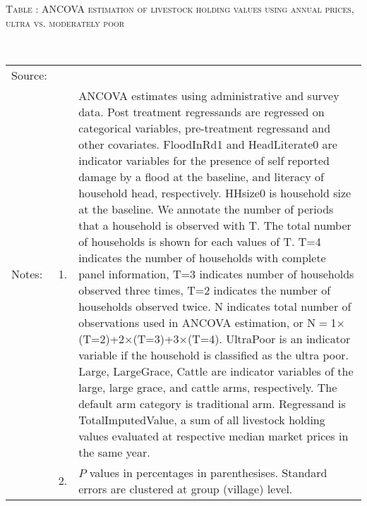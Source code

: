 \hspace{-1cm}\begin{minipage}[t]{14cm}
\hfil\textsc{\normalsize Table \thetable: ANCOVA estimation of livestock holding values using annual prices, ultra vs. moderately poor\label{tab ANCOVA livestock  annual price poor}}\\
\setlength{\tabcolsep}{1pt}
\setlength{\baselineskip}{8pt}
\renewcommand{\arraystretch}{.55}
\hfil{}\\
\renewcommand{\arraystretch}{.8}
\setlength{\tabcolsep}{1pt}
\begin{tabular}{>{\hfill\scriptsize}p{1cm}<{}>{\hfill\scriptsize}p{.25cm}<{}>{\scriptsize}p{12cm}<{\hfill}}
Source:& \multicolumn{2}{l}{\scriptsize Estimated with GUK administrative and survey data.}\\
Notes: & 1. & ANCOVA estimates using administrative and survey data. Post treatment regressands are regressed on categorical variables, pre-treatment regressand and other covariates. \textsf{FloodInRd1} and \textsf{HeadLiterate0} are indicator variables for the presence of self reported damage by a flood at the baseline, and literacy of household head, respectively. \textsf{HHsize0} is household size at the baseline. We annotate the number of periods that a household is observed with \textsf{T}. The total number of households is shown for each values of \textsf{T}. \textsf{T=4} indicates the number of households with complete panel information, \textsf{T=3} indicates number of households observed three times, \textsf{T=2} indicates the number of households observed twice. \textsf{N} indicates total number of observations used in ANCOVA estimation, or \textsf{N$=$1$\times$(T=2)+2$\times$(T=3)+3$\times$(T=4)}.  \textsf{UltraPoor} is an indicator variable if the household is classified as the ultra poor. \textsf{Large}, \textsf{LargeGrace}, \textsf{Cattle} are indicator variables of the \textsf{large}, \textsf{large grace}, and \textsf{cattle} arms, respectively. The default arm category is \textsf{traditional} arm. Regressand is \textsf{TotalImputedValue}, a sum of all livestock holding values evaluated at respective median market prices in the same year. \\
& 2. & $P$ values in percentages in parenthesises. Standard errors are clustered at group (village) level.
\end{tabular}
\end{minipage}

